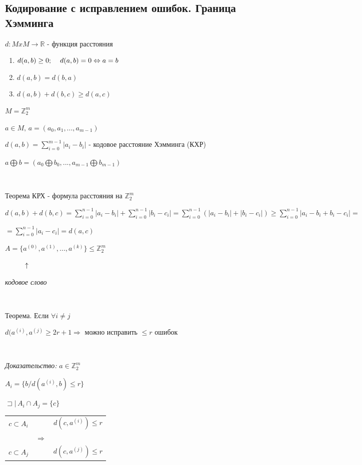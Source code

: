 \documentclass[12pt]{article}
\begin{document}
\subsection{Кодирование с исправлением ошибок. Граница Хэмминга}
$d:MxM \rightarrow \mathbb{R}$ - функция расстояния
\begin{enumerate}
    \item $d(a,b) \geq 0; \hspace{4 mm} d(a,b) = 0 \Leftrightarrow a = b$
    \item $d(a,b) = d(b,a)$
    \item $d(a,b) + d(b,c) \geq d(a,c)$
\end{enumerate}\par
$M = \mathbb{Z}_2^m$\par
$a \in M, \,a = (a_0, a_1, ..., a_{m-1})$\par
$d(a,b) = \sum\limits_{i=0}^{m-1} |a_i - b_i|$ - кодовое расстояние Хэмминга (КХР)\par
$a \bigoplus b = (a_0 \bigoplus b_0, ... , a_{m-1} \bigoplus b_{m-1})$\par
$ $\par
Теорема КРХ - формула расстояния на $\mathbb{Z}_2^m$\par
$d(a,b)+d(b,c) = \sum\limits_{i=0}^{n-1}|a_i - b_i|+\sum\limits_{i=0}^{n-1}|b_i - c_i|=\sum\limits_{i=0}^{n-1}(|a_i - b_i|+|b_i - c_i|) \geq \sum\limits_{i=0}^{n-1}|a_i - b_i + b_i - c_i| =$\par
$ =\sum\limits_{i=0}^{n-1}|a_i - c_i| = d(a,c)$\par
$A=\{a^{(0)}, a^{(1)}, ... , a^{(k)}\} \leq \mathbb{Z}_2^m$\par
$\hspace{1 cm} \uparrow$\par
\textit{кодовое слово}\par
$ $\par
Теорема. Если $\forall i \neq j$\par
$d(a^{(i)},a^{(j)} \geq 2r+1 \Rightarrow$ можно исправить $\leq r$ ошибок \par
$ $\par
\textit{Доказательство:} $a \in \mathbb{Z}_2^m$\par
$A_i = \{ b / d(a^{(i)}, b) \leq r \}$\par
$\sqsupset | \, A_i \cap A_j = \{ c \}$\par
\begin{tabular}{c|cc}
    $c \subset A_i$ &               & $d(c,a^{(i)}) \leq r$ \\
                    & $\Rightarrow$                         \\
    $c \subset A_j$ &               & $d(c,a^{(j)}) \leq r$ \\
\end{tabular}\par
\end{document}
